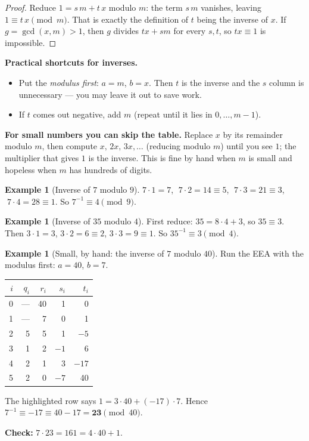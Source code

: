 \documentclass[11pt]{article}
\theoremstyle{definition}
\newtheorem{example}[theorem]{Example}
\theoremstyle{remark}
\newcommand{\hl}{\rowcolor{green!15}}   %
\begin{document}
\begin{proof}
Reduce $1=s\,m+t\,x$ modulo $m$: the term $s\,m$ vanishes, leaving $1\equiv t\,x\pmod m$. That is exactly the definition of $t$ being the inverse of $x$. If $g=\gcd(x,m)>1$, then $g$ divides $tx+sm$ for every $s,t$, so $tx\equiv1$ is impossible.
\end{proof}

\textbf{Practical shortcuts for inverses.}
\begin{itemize}[nosep]
\item Put the \emph{modulus first}: $a=m$, $b=x$. Then $t$ is the inverse and the $s$ column is unnecessary --- you may leave it out to save work.
\item If $t$ comes out negative, add $m$ (repeat until it lies in $0,\dots,m-1$).
\end{itemize}

\textbf{For small numbers you can skip the table.} Replace $x$ by its remainder modulo $m$, then compute $x,\,2x,\,3x,\dots$ (reducing modulo $m$) until you see $1$; the multiplier that gives $1$ is the inverse. This is fine by hand when $m$ is small and hopeless when $m$ has hundreds of digits.

\begin{example}[Inverse of $7$ modulo $9$]\label{ex:inv7-9}
$7\cdot1=7$, $\;7\cdot2=14\equiv5$, $\;7\cdot3=21\equiv3$, $\;7\cdot4=28\equiv1$. So $7^{-1}\equiv 4\pmod 9$.
\end{example}

\begin{example}[Inverse of $35$ modulo $4$]
First reduce: $35=8\cdot4+3$, so $35\equiv3$. Then $3\cdot1=3$, $3\cdot2=6\equiv2$, $3\cdot3=9\equiv1$. So $35^{-1}\equiv3\pmod 4$.
\end{example}


\begin{example}[Small, by hand: the inverse of $7$ modulo $40$]\label{ex:inv7-40}
Run the EEA with the modulus first: $a=40$, $b=7$.
\begin{center}
\renewcommand{\arraystretch}{1.2}
\begin{tabular}{@{}rrrrr@{}}
\toprule
$i$ & $q_i$ & $r_i$ & $s_i$ & $t_i$ \\
\midrule
0 & --- & 40 & 1 & 0 \\
1 & --- & 7 & 0 & 1 \\
2 & 5 & 5 & 1 & $-5$ \\
3 & 1 & 2 & $-1$ & 6 \\
\hl 4 & 2 & 1 & 3 & $-17$ \\
5 & 2 & 0 & $-7$ & 40 \\
\bottomrule
\end{tabular}
\end{center}
The highlighted row says $1=3\cdot40+(-17)\cdot7$. Hence $7^{-1}\equiv-17\equiv 40-17=\mathbf{23}\pmod{40}$.

\textbf{Check:} $7\cdot23=161=4\cdot40+1$. \checkmark
\end{example}
\end{document}
